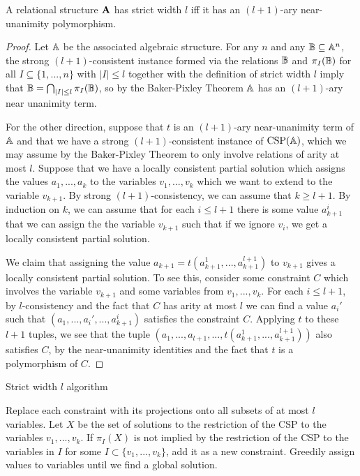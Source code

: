 \documentclass[letterpaper,11pt]{article}
\DeclareMathOperator{\CSP}{CSP}
\begin{document}
\begin{thm} A relational structure $\mathbf{A}$ has strict width $l$ iff it has an $(l+1)$-ary near-unanimity polymorphism.
\end{thm}
\begin{proof} Let $\mathbb{A}$ be the associated algebraic structure. For any $n$ and any $\mathbb{B} \subseteq \mathbb{A}^n$, the strong $(l+1)$-consistent instance formed via the relations $\mathbb{B}$ and $\pi_I(\mathbb{B})$ for all $I \subseteq \{1, ..., n\}$ with $|I| \le l$ together with the definition of strict width $l$ imply that $\mathbb{B} = \bigcap_{|I| \le l} \pi_I(\mathbb{B})$, so by the Baker-Pixley Theorem $\mathbb{A}$ has an $(l+1)$-ary near unanimity term.

For the other direction, suppose that $t$ is an $(l+1)$-ary near-unanimity term of $\mathbb{A}$ and that we have a strong $(l+1)$-consistent instance of $\CSP(\bA)$, which we may assume by the Baker-Pixley Theorem to only involve relations of arity at most $l$. Suppose that we have a locally consistent partial solution which assigns the values $a_1, ..., a_k$ to the variables $v_1, ..., v_k$ which we want to extend to the variable $v_{k+1}$. By strong $(l+1)$-consistency, we can assume that $k \ge l+1$. By induction on $k$, we can assume that for each $i \le l+1$ there is some value $a_{k+1}^i$ that we can assign the the variable $v_{k+1}$ such that if we ignore $v_i$, we get a locally consistent partial solution.

We claim that assigning the value $a_{k+1} = t(a_{k+1}^1, ..., a_{k+1}^{l+1})$ to $v_{k+1}$ gives a locally consistent partial solution. To see this, consider some constraint $C$ which involves the variable $v_{k+1}$ and some variables from $v_1, ..., v_k$. For each $i \le l+1$, by $l$-consistency and the fact that $C$ has arity at most $l$ we can find a value $a_i'$ such that $(a_1, ..., a_i', ..., a_{k+1}^i)$ satisfies the constraint $C$. Applying $t$ to these $l+1$ tuples, we see that the tuple $(a_1, ..., a_{l+1}, ..., t(a_{k+1}^1, ..., a_{k+1}^{l+1}))$ also satisfies $C$, by the near-unanimity identities and the fact that $t$ is a polymorphism of $C$.
\end{proof}

\begin{algorithm}
\caption{Strict width $l$ algorithm}
\begin{algorithmic}[1]
\State Replace each constraint with its projections onto all subsets of at most $l$ variables.
\Repeat
{}
\State Let $X$ be the set of solutions to the restriction of the CSP to the variables $v_1, ..., v_k$.
\State If $\pi_I(X)$ is not implied by the restriction of the CSP to the variables in $I$ for some $I \subset \{v_1, ..., v_k\}$, add it as a new constraint.
\EndFor
{}
\State Greedily assign values to variables until we find a global solution.
\end{algorithmic}
\end{algorithm}
\end{document}
